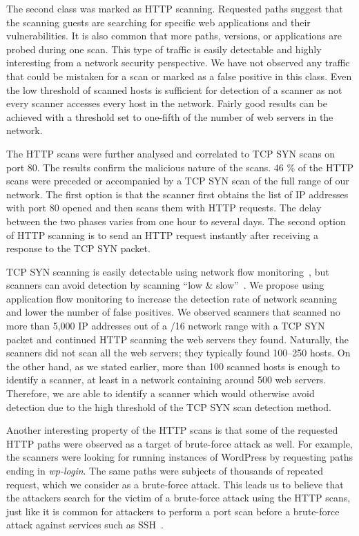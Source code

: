 The second class was marked as HTTP scanning. Requested paths suggest that the scanning guests are searching for specific web applications and their vulnerabilities. It is also common that more paths, versions, or applications are probed during one scan. This type of traffic is easily detectable and highly interesting from a network security perspective. We have not observed any traffic that could be mistaken for a scan or marked as a false positive in this class. Even the low threshold of scanned hosts is sufficient for detection of a scanner as not every scanner accesses every host in the network. Fairly good results can be achieved with a threshold set to one-fifth of the number of web servers in the network.

The HTTP scans were further analysed and correlated to TCP SYN scans on port 80. The results confirm the malicious nature of the scans. 46 \% of the HTTP scans were preceded or accompanied by a TCP SYN scan of the full range of our network. The first option is that the scanner first obtains the list of IP addresses with port 80 opened and then scans them with HTTP requests. The delay between the two phases varies from one hour to several days. The second option of HTTP scanning is to send an HTTP request instantly after receiving a response to the TCP SYN packet.

TCP SYN scanning is easily detectable using network flow monitoring~\cite{Sperotto-2010-Overview}, but scanners can avoid detection by scanning ``low \& slow''~\cite{Kang-2007-Distributed}. We propose using application flow monitoring to increase the detection rate of network scanning and lower the number of false positives. We observed scanners that scanned no more than 5,000 IP addresses out of a /16 network range with a TCP SYN packet and continued HTTP scanning the web servers they found. Naturally, the scanners did not scan all the web servers; they typically found 100--250 hosts. On the other hand, as we stated earlier, more than 100 scanned hosts is enough to identify a scanner, at least in a network containing around 500 web servers. Therefore, we are able to identify a scanner which would otherwise avoid detection due to the high threshold of the TCP SYN scan detection method.

Another interesting property of the HTTP scans is that some of the requested HTTP paths were observed as a target of brute-force attack as well. For example, the scanners were looking for running instances of WordPress by requesting paths ending in \textit{wp-login}. The same paths were subjects of thousands of repeated request, which we consider as a brute-force attack. This leads us to believe that the attackers search for the victim of a brute-force attack using the HTTP scans, just like it is common for attackers to perform a port scan before a brute-force attack against services such as SSH~\cite{Vykopal-2013-Flow}.

